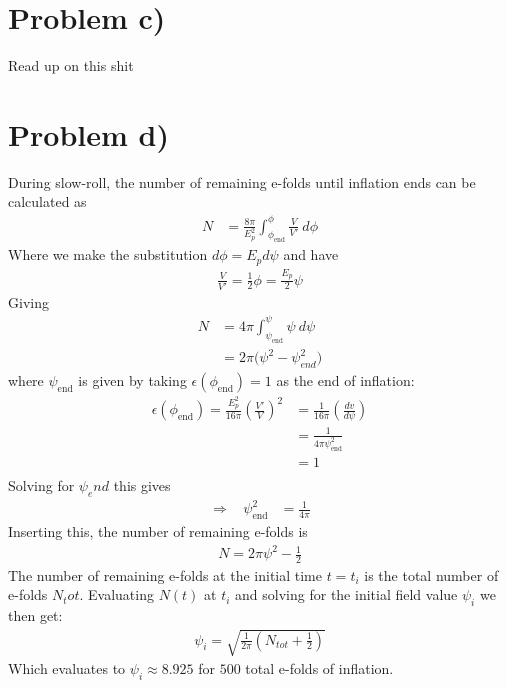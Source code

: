 \documentclass[reprint,english,notitlepage]{revtex4-1}  %
\numberwithin{equation}{section}
\begin{document}
\section{Problem c)}
Read up on this shit

\section{Problem d)}
During slow-roll, the number of remaining e-folds until inflation ends can be
calculated as
\begin{align}
	N &= \frac{8\pi}{E_p^2} \int_{\phi_{\mathrm{end}}}^\phi \frac{V}{V'}\ d\phi
\end{align}
Where we make the substitution $d\phi = E_p d\psi$ and have
\begin{align}
	\frac{V}{V'} = \frac{1}{2}\phi = \frac{E_p}{2}\psi
\end{align}
Giving
\begin{align}
	N &= 4\pi \int_{\psi_{\mathrm{end}}}^\psi \psi\ d\psi \\
	  &= 2\pi \bigg( \psi^2 - \psi_{end}^2 \bigg)	\label{eq:N-psi_i}
\end{align}
where $\psi_{\mathrm{end}}$ is given by taking $\epsilon(\phi_{\mathrm{end}})=1$
as the end of inflation:
\begin{align}
	\epsilon(\phi_{\mathrm{end}}) = \frac{E_p^2}{16\pi} \left(\frac{V'}{V}\right)^2
	 	&= \frac{1}{16\pi}\left(\frac{dv}{d\psi}\right) \\
											 &= \frac{1}{4\pi \psi_{\mathrm{end}}^2} \\
											 &= 1 \\
\end{align}
Solving for $\psi_end$ this gives
\begin{align}
	\Rightarrow \ \ \ \ \psi_{\mathrm{end}}^2 &= \frac{1}{4\pi}
\end{align}
Inserting this, the number of remaining e-folds is
\begin{align}
	N = 2\pi \psi^2 - \frac{1}{2}
\end{align}
The number of remaining e-folds at the initial time $t=t_i$ is
the total number of e-folds $N_tot$. Evaluating $N(t)$ at $t_i$ and solving for
the initial field value $\psi_i$ we then get:
\begin{align}
	\psi_i = \sqrt{ \frac{1}{2\pi} \left(N_{tot} + \frac{1}{2} \right) }
\end{align}
Which evaluates to $\psi_i \approx 8.925$ for $500$ total e-folds of inflation.
\end{document}
